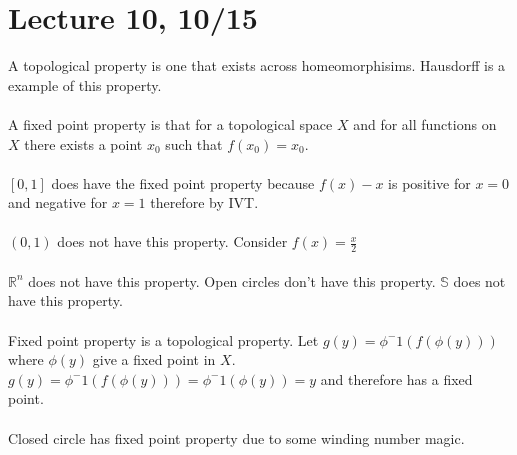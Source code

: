 \documentclass[12pt]{article}
\begin{document}
\section{Lecture 10, 10/15}
A topological property is one that exists across homeomorphisims. Hausdorff is a example of this property. \\\\
A fixed point property is that for a topological space $X$ and for all functions on $X$ there exists a point $x_0$ such that $f(x_0) = x_0$. \\\\
$[0,1]$ does have the fixed point property because $f(x) - x$ is positive for $x = 0$ and negative for $x = 1$ therefore by IVT. \\\\
$(0,1)$ does not have this property. Consider $f(x) = \frac{x}{2}$\\\\
$\mathbb{R}^n$ does not have this property. Open circles don't have this property. $\mathbb{S}$ does not have this property. \\\\
Fixed point property is a topological property. Let $g(y) = \phi^-1(f(\phi(y)))$ where $\phi(y)$ give a fixed point in $X$. $g(y) = \phi^-1(f(\phi(y))) = \phi^-1(\phi(y)) = y$ and therefore has a fixed point. \\\\
Closed circle has fixed point property due to some winding number magic. 
\end{document}
